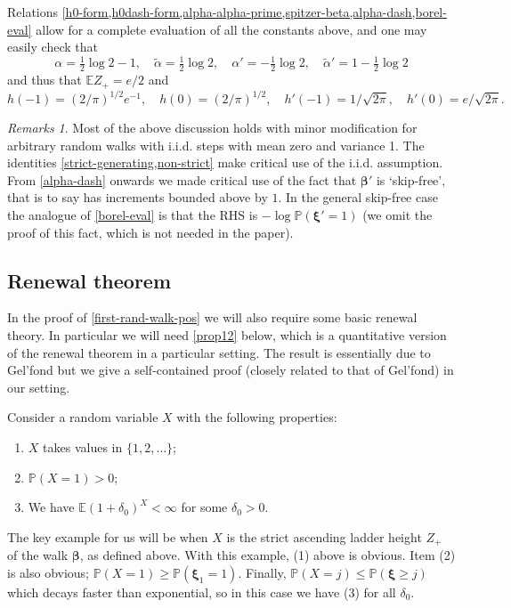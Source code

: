 \documentclass[11pt,reqno]{amsart}
\numberwithin{equation}{section}
\theoremstyle{definition}
\theoremstyle{remark}
\newtheorem*{remarks}{Remarks}
\newcommand{\mb}{\mathbb}
\def\boldbeta{\boldsymbol\beta}
\def\boldxi{\boldsymbol\xi}
\renewcommand{\le}{\leqslant}
\renewcommand{\ge}{\geqslant}
\begin{document}
Relations \cref{h0-form,h0dash-form,alpha-alpha-prime,spitzer-beta,alpha-dash,borel-eval} allow for a complete evaluation of all the constants above, and one may easily check that 
\begin{equation*} \alpha = \tfrac{1}{2} \log 2 - 1, \quad \tilde \alpha = \tfrac{1}{2} \log 2, \quad \alpha' = -\tfrac{1}{2} \log 2, \quad \tilde \alpha' = 1 - \tfrac{1}{2} \log 2  \end{equation*} and thus that $\mb{E}Z_+ = e/2$ and
\begin{equation}\label{h0h0} h(-1) = (2/\pi)^{1/2}e^{-1}, \quad h(0) = (2/\pi)^{1/2}, \quad h'(-1) = 1/\sqrt{2\pi}, \quad h'(0) = e/\sqrt{2\pi} .\end{equation}


\begin{remarks} Most of the above discussion holds with minor modification for arbitrary random walks with i.i.d. steps with mean zero and variance 1. The identities \cref{strict-generating,non-strict} make critical use of the i.i.d. assumption. From \cref{alpha-dash} onwards we made critical use of the fact that $\boldbeta'$ is `skip-free', that is to say has increments bounded above by $1$. In the general skip-free case the analogue of \cref{borel-eval} is that the RHS is $-\log \mb{P}(\boldxi' = 1)$ (we omit the proof of this fact, which is not needed in the paper).
\end{remarks}


\subsection{Renewal theorem} In the proof of \cref{first-rand-walk-pos} we will also require some basic renewal theory. In particular we will need \cref{prop12} below, which is a quantitative version of the renewal theorem in a particular setting. The result is essentially due to Gel'fond \cite{gelfond} but we give a self-contained proof (closely related to that of Gel'fond) in our setting.

Consider a random variable $X$ with the following properties:

\begin{enumerate}
\item $X$ takes values in $\{1,2,\dots\}$;
\item $\mb{P}(X = 1) > 0$;
\item We have $\mb{E} (1 + \delta_0)^X < \infty$ for some $\delta_0 > 0$.
\end{enumerate}
The key example for us will be when $X$ is the strict ascending ladder height $Z_+$ of the walk $\boldbeta$, as defined above. With this example, (1) above is obvious. Item (2) is also obvious; $\mb{P}(X = 1) \ge \mb{P}(\boldxi_1 = 1)$. Finally, $\mb{P}(X = j) \le  \mb{P}(\boldxi \ge j)$ which decays faster than exponential, so in this case we have (3) for all $\delta_0$.
\end{document}
